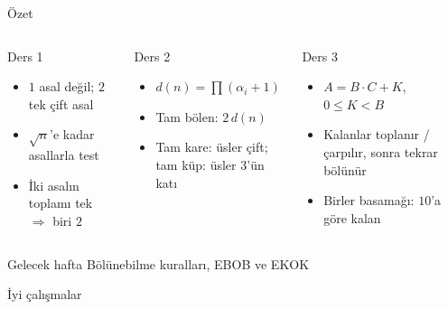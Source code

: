 \documentclass[aspectratio=169,11pt]{beamer}
\begin{document}
\begin{frame}{Özet}
\begin{columns}[t]
\begin{block}{Ders 1}
\begin{itemize}
\item \(1\) asal değil; \(2\) tek çift asal
\item \(\sqrt{n}\)'e kadar asallarla test
\item İki asalın toplamı tek \(\Rightarrow\) biri \(2\)
\end{itemize}
\end{block}
\begin{block}{Ders 2}
\begin{itemize}
\item \(d(n)=\prod(\alpha_i+1)\)
\item Tam bölen: \(2\,d(n)\)
\item Tam kare: üsler çift; tam küp: üsler \(3\)'ün katı
\end{itemize}
\end{block}
\begin{block}{Ders 3}
\begin{itemize}
\item \(A=B\cdot C+K\), \(0\le K<B\)
\item Kalanlar toplanır / çarpılır, sonra tekrar bölünür
\item Birler basamağı: \(10\)'a göre kalan
\end{itemize}
\end{block}
\end{columns}
\vspace{6pt}
\begin{alertblock}{Gelecek hafta}
Bölünebilme kuralları, EBOB ve EKOK
\end{alertblock}
\end{frame}

\begin{frame}
\centering\Large İyi çalışmalar
\end{frame}
\end{document}
